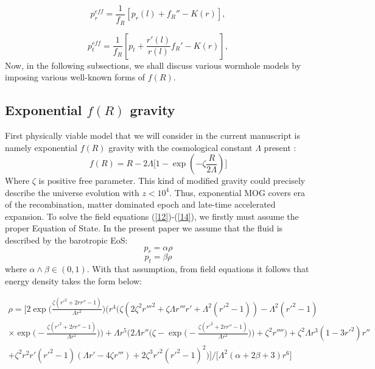 \begin{equation}
\label{13a}
p_r^{eff}=\frac{1}{f_R}\left[p_r(l)+f_R''-K(r)\right],
\end{equation}

\begin{equation}
\label{14a}
p_t^{eff}=\frac{1}{f_R}\left[p_t+\frac{r'(l)}{r(l)}f_R'-K(r)\right],
\end{equation}
Now, in the following subsections, we shall discuss various wormhole models by imposing various well-known forms of $f(R)$.

\subsection{Exponential $f(R)$ gravity}

First physically viable model that we will consider in the current manuscript is namely exponential $f(R)$ gravity with the cosmological constant $\Lambda$ present \cite{ref65,ref66,ref67,ref68,ref69,ref70}:
\begin{equation}
    f(R)=R-2\Lambda\bigg[1-\exp \left(-\zeta \frac{R}{2\Lambda}\right)\bigg]
\end{equation}
Where $\zeta$ is positive free parameter. This kind of modified gravity could precisely describe the universe evolution with $z<10^4$. Thus, exponential MOG covers era of the recombination, matter dominated epoch and late-time accelerated expansion. To solve the field equations (\ref{12})-(\ref{14}), we firstly must assume the proper Equation of State. In the present paper we assume that the fluid is described by the barotropic EoS:
\begin{equation}
    p_r = \alpha \rho
    \label{eq:26}
\end{equation}
\begin{equation}
    p_t = \beta \rho
    \label{eq:27}
\end{equation}
where $\alpha\land\beta\in(0,1)$. With that assumption, from field equations it follows that energy density takes the form below:
\begin{widetext}
\begin{equation}
    \begin{gathered}
    \rho = \bigg[2 \exp \bigg(\frac{\zeta  \left(r'^2+2 r r''-1\right)}{\Lambda  r^2}\bigg) \bigg(r^4 \bigg(\zeta  \left(2 \zeta ^2 r'''^2+\zeta  \Lambda 
   r''' r'+\Lambda ^2 \left(r'^2-1\right)\right)-\Lambda ^2 \left(r'^2-1\right)\\
   \times \exp \bigg(-\frac{\zeta  \left(r'^2+2 r r''-1\right)}{\Lambda 
   r^2}\bigg)\bigg)+\Lambda  r^5 \bigg(2 \Lambda  r'' \bigg(\zeta -\exp \bigg(-\frac{\zeta  \left(r'^2+2 r r''-1\right)}{\Lambda 
   r^2}\bigg)\bigg)+\zeta ^2 r''''\bigg)+\zeta ^2 \Lambda  r^3 \left(1-3 r'^2\right) r''\\
   +\zeta ^2 r^2 r' \left(r'^2-1\right) \left(\Lambda 
   r'-4 \zeta  r'''\right)+2 \zeta ^3 r'^2 \left(r'^2-1\right)^2\bigg)\bigg]\bigg/\bigg[\Lambda ^2 (\alpha +2 \beta +3) r^6\bigg]
    \end{gathered}
\end{equation}
\end{widetext}
